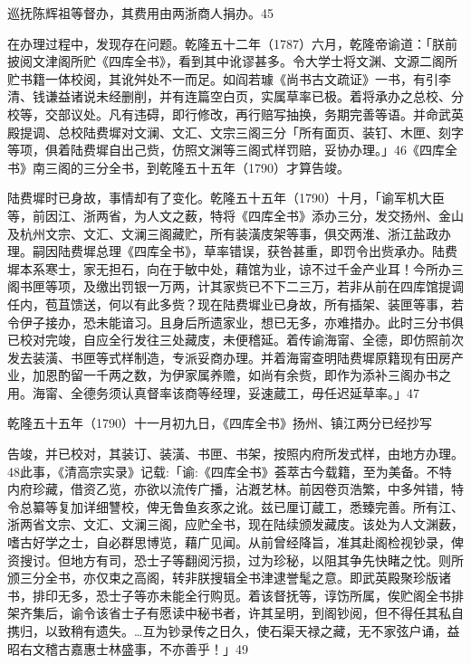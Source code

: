 \noindent 巡抚陈辉祖等督办，其费用由两浙商人捐办。45

在办理过程中，发现存在问题。乾隆五十二年（1787）六月，乾隆帝谕道：「朕前披阅文津阁所贮《四库全书》，看到其中讹谬甚多。令大学士将文渊、文源二阁所贮书籍一体校阅，其讹舛处不一而足。如阎若璩《尚书古文疏证》一书，有引李清、钱谦益诸说未经删削，并有连篇空白页，实属草率已极。着将承办之总校、分校等，交部议处。凡有违碍，即行修改，再行赔写抽换，务期完善等语。并命武英殿提调、总校陆费墀对文澜、文汇、文宗三阁三分「所有面页、装钉、木匣、刻字等项，俱着陆费墀自出己赀，仿照文渊等三阁式样罚赔，妥协办理。」46《四库全书》南三阁的三分全书，到乾隆五十五年（1790）才算告竣。

陆费墀时已身故，事情却有了变化。乾隆五十五年（1790）十月，「谕军机大臣等，前因江、浙两省，为人文之薮，特将《四库全书》添办三分，发交扬州、金山及杭州文宗、文汇、文澜三阁藏贮，所有装潢庋架等事，俱交两淮、浙江盐政办理。嗣因陆费墀总理《四库全书》，草率错误，获咎甚重，即罚令出赀承办。陆费墀本系寒士，家无担石，向在于敏中处，藉馆为业，谅不过千金产业耳！今所办三阁书匣等项，及缴出罚银一万两，计其家赀已不下二三万，若非从前在四库馆提调任内，苞苴馈送，何以有此多赀？现在陆费墀业已身故，所有插架、装匣等事，若令伊子接办，恐未能谙习。且身后所遗家业，想已无多，亦难措办。此时三分书俱已校对完竣，自应全行发往三处藏庋，未便稽延。着传谕海甯、全德，即仿照前次发去装潢、书匣等式样制造，专派妥商办理。并着海甯查明陆费墀原籍现有田房产业，加恩酌留一千两之数，为伊家属养赡，如尚有余赀，即作为添补三阁办书之用。海甯、全德务须认真督率该商等经理，妥速蔵工，毋任迟延草率。」47

乾隆五十五年（1790）十一月初九日，《四库全书》扬州、镇江两分已经抄写

\vfill
\begin{BookNotes}
\end{BookNotes}

\noindent 告竣，并已校对，其装订、装潢、书匣、书架，按照内府所发式样，由地方办理。48此事，《清高宗实录》记载:「谕:《四库全书》荟萃古今载籍，至为美备。不特内府珍藏，借资乙览，亦欲以流传广播，沾漑艺林。前因卷页浩繁，中多舛错，特令总纂等复加详细讐校，俾无鲁鱼亥豕之讹。兹已厘订蔵工，悉臻完善。所有江、浙两省文宗、文汇、文澜三阁，应贮全书，现在陆续颁发藏庋。该处为人文渊薮，嗜古好学之士，自必群思博览，藉广见闻。从前曾经降旨，准其赴阁检视钞录，俾资搜讨。但地方有司，恐士子等翻阅污损，过为珍秘，以阻其争先快睹之忱。则所颁三分全书，亦仅束之高阁，转非朕搜辑全书津逮誉髦之意。即武英殿聚珍版诸书，排印无多，恐士子等亦未能全行购觅。着该督抚等，谆饬所属，俟贮阁全书排架齐集后，谕令该省士子有愿读中秘书者，许其呈明，到阁钞阅，但不得任其私自携归，以致稍有遗失。…互为钞录传之日久，使石渠天禄之藏，无不家弦户诵，益昭右文稽古嘉惠士林盛事，不亦善乎！」49

